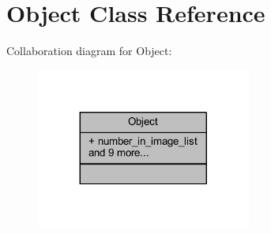 \hypertarget{class_object}{}\section{Object Class Reference}
\label{class_object}


Collaboration diagram for Object\+:\nopagebreak
\begin{figure}[H]
\begin{center}
\leavevmode
\includegraphics[width=200pt]{class_object__coll__graph}
\end{center}
\end{figure}
